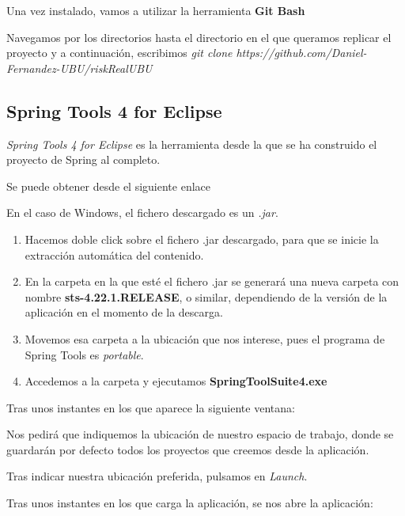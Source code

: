 Una vez instalado, vamos a utilizar la herramienta \textbf{Git Bash}

Navegamos por los directorios hasta el directorio en el que queramos replicar el proyecto y a continuación, escribimos \textit{git clone https://github.com/Daniel-Fernandez-UBU/riskRealUBU}

\subsection{Spring Tools 4 for Eclipse}

\textit{Spring Tools 4 for Eclipse} es la herramienta desde la que se ha construido el proyecto de Spring al completo. 

Se puede obtener desde el siguiente enlace \cite{web:springtoolssuite}

En el caso de Windows, el fichero descargado es un \textit{.jar}. 

\begin{enumerate}
	\item Hacemos doble click sobre el fichero .jar descargado, para que se inicie la extracción automática del contenido.
	\item En la carpeta en la que esté el fichero .jar se generará una nueva carpeta con nombre \textbf{sts-4.22.1.RELEASE}, o similar, dependiendo de la versión de la aplicación en el momento de la descarga.
	\item Movemos esa carpeta a la ubicación que nos interese, pues el programa de Spring Tools es \textit{portable}.
	\item Accedemos a la carpeta y ejecutamos \textbf{SpringToolSuite4.exe}
\end{enumerate}

Tras unos instantes en los que aparece la siguiente ventana:

Nos pedirá que indiquemos la ubicación de nuestro espacio de trabajo, donde se guardarán por defecto todos los proyectos que creemos desde la aplicación.

Tras indicar nuestra ubicación preferida, pulsamos en \textit{Launch}.

Tras unos instantes en los que carga la aplicación, se nos abre la aplicación:


